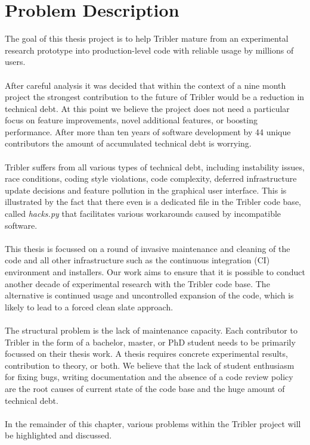 \chapter{Problem Description}
\label{chapter:problem-description}
The goal of this thesis project is to help Tribler mature from an experimental research prototype into production-level code with reliable usage by millions of users.\\\\
After careful analysis it was decided that within the context of a nine month project the strongest contribution to the future of Tribler would be a reduction in technical debt. At this point we believe the project does not need a particular focus on feature improvements, novel additional features, or boosting performance. After more than ten years of software development by 44 unique contributors the amount of accumulated technical debt is worrying.\\\\
Tribler suffers from all various types of technical debt, including instability issues, race conditions, coding style violations, code complexity, deferred infrastructure update decisions and feature pollution in the graphical user interface. This is illustrated by the fact that there even is a dedicated file in the Tribler code base, called \emph{hacks.py} that facilitates various workarounds caused by incompatible software.\\\\
This thesis is focussed on a round of invasive maintenance and cleaning of the code and all other infrastructure such as the continuous integration (CI) environment and installers. Our work aims to ensure that it is possible to conduct another decade of experimental research with the Tribler code base. The alternative is continued usage and uncontrolled expansion of the code, which is likely to lead to a forced clean slate approach.\\\\
The structural problem is the lack of maintenance capacity. Each contributor to Tribler in the form of a bachelor, master, or PhD student needs to be primarily focussed on their thesis work. A thesis requires concrete experimental results, contribution to theory, or both. We believe that the lack of student enthusiasm for fixing bugs, writing documentation and the absence of a code review policy are the root causes of current state of the code base and the huge amount of technical debt.\\\\
In the remainder of this chapter, various problems within the Tribler project will be highlighted and discussed.


